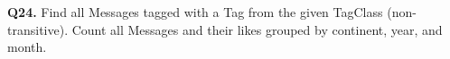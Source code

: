 \textbf{Q24.}
Find all Messages tagged with a Tag from the given TagClass
(non-transitive).
Count all Messages and their likes grouped by continent, year, and
month.
